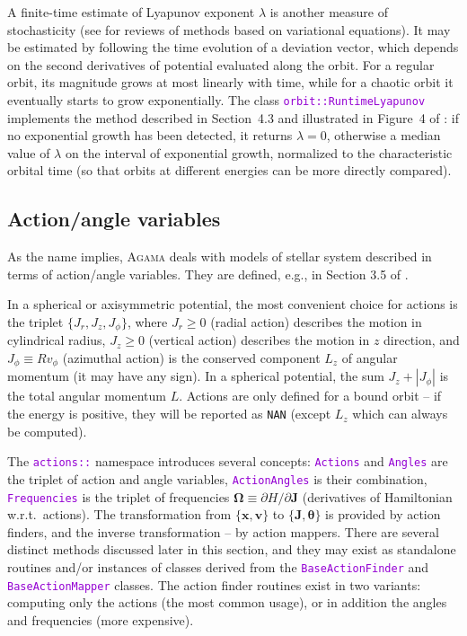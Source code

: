 \documentclass[12pt]{article}
\newcommand{\Agama}{\textsc{Agama}\xspace}
\newcommand{\ttt}[1]{\textcolor{darkviolet}{\texttt{#1}}}
\newcommand{\D}{\partial}
\newcommand{\bv}{\boldsymbol{v}}
\newcommand{\bx}{\boldsymbol{x}}
\newcommand{\bJ}{\boldsymbol{J}}
\newcommand{\bt}{\boldsymbol{\theta}}
\begin{document}
A finite-time estimate of Lyapunov exponent $\lambda$ is another measure of stochasticity (see \cite{Carpintero2014, Skokos2010} for reviews of methods based on variational equations). It may be estimated by following the time evolution of a deviation vector, which depends on the second derivatives of potential evaluated along the orbit. For a regular orbit, its magnitude grows at most linearly with time, while for a chaotic orbit it eventually starts to grow exponentially. The class \ttt{orbit::RuntimeLyapunov} implements the method described in Section~4.3 and illustrated in Figure~4 of \cite{Vasiliev2013}: if no exponential growth has been detected, it returns $\lambda=0$, otherwise a median value of $\lambda$ on the interval of exponential growth, normalized to the characteristic orbital time (so that orbits at different energies can be more directly compared).


\subsection{Action/angle variables}  \label{sec:ActionAngle}

As the name implies, \Agama deals with models of stellar system described in terms of action/angle variables. They are defined, e.g., in Section 3.5 of \cite{BinneyTremaine}.

In a spherical or axisymmetric potential, the most convenient choice for actions is the triplet $\{J_r, J_z, J_\phi\}$, where $J_r\ge 0$ (radial action) describes the motion in cylindrical radius, $J_z\ge 0$ (vertical action) describes the motion in $z$ direction, and $J_\phi \equiv R v_\phi$ (azimuthal action) is the conserved component $L_z$ of angular momentum (it may have any sign). In a spherical potential, the sum $J_z + |J_\phi|$ is the total angular momentum $L$. Actions are only defined for a bound orbit -- if the energy is positive, they will be reported as \texttt{NAN} (except $L_z$ which can always be computed).

The \ttt{actions::} namespace introduces several concepts: \ttt{Actions} and \ttt{Angles} are the triplet of action and angle variables, \ttt{ActionAngles} is their combination, \ttt{Frequencies} is the triplet of frequencies $\boldsymbol{\Omega}\equiv \D H/\D \bJ$ (derivatives of Hamiltonian w.r.t.\ actions). 
The transformation from $\{\bx,\bv\}$ to $\{\bJ,\bt\}$ is provided by action finders, and the inverse transformation -- by action mappers. There are several distinct methods discussed later in this section, and they may exist as standalone routines and/or instances of classes derived from the \ttt{BaseActionFinder} and \ttt{BaseActionMapper} classes. The action finder routines exist in two variants: computing only the actions (the most common usage), or in addition the angles and frequencies (more expensive).
\end{document}
